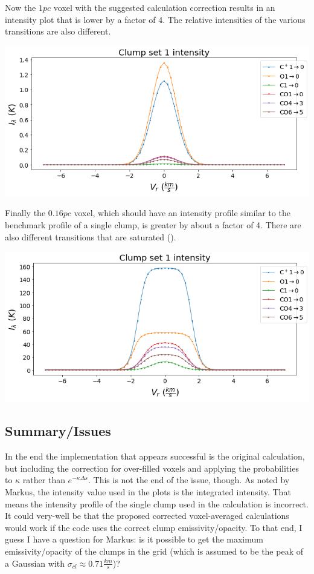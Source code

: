 \documentclass[a4paper]{article}
\begin{document}
    Now the \(1 pc\) voxel with the suggested calculation correction results in an intensity plot that is lower by a factor of 4.
    The relative intensities of the various transitions are also different.

    \includegraphics*[width=\linewidth]{voxel_convergence_fv-calc-opacity-pexp.png}

    Finally the \(0.16 pc\) voxel, which should have an intensity profile similar to the benchmark profile of a single clump, is greater by about a factor of 4.
    There are also different transitions that are saturated ().

    \includegraphics*[width=\linewidth]{voxel_single-clump_fv-calc-opacity-pexp.png}

    \pagebreak

    \subsection{Summary/Issues}

    In the end the implementation that appears successful is the original calculation, but including the correction for over-filled voxels and applying the probabilities to \(\kappa\) rather than \(e^{-\kappa \Delta s}\).
    This is not the end of the issue, though.
    As noted by Markus, the intensity value used in the plots is the integrated intensity.
    That means the intensity profile of the single clump used in the calculation is incorrect.
    It could very-well be that the proposed corrected voxel-averaged calculations would work if the code uses the correct clump emissivity/opacity.
    To that end, I guess I have a question for Markus: is it possible to get the maximum emissivity/opacity of the clumps in the grid (which is assumed to be the peak of a Gaussian with \(\sigma_{cl} \approx 0.71 \frac{km}{s}\))?
\end{document}

